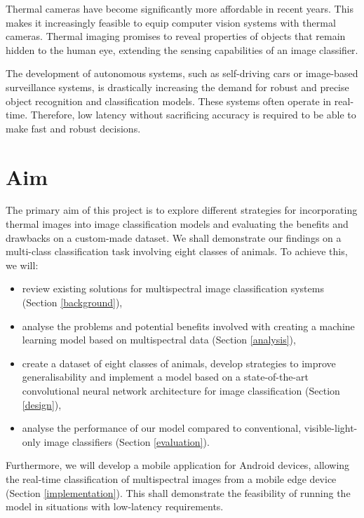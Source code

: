 \documentclass{l4proj}
\begin{document}
Thermal cameras have become significantly more affordable in recent years. This makes it increasingly feasible to equip computer vision systems with thermal cameras. Thermal imaging promises to reveal properties of objects that remain hidden to the human eye, extending the sensing capabilities of an image classifier.

The development of autonomous systems, such as self-driving cars or image-based surveillance systems, is drastically increasing the demand for robust and precise object recognition and classification models. These systems often operate in real-time. Therefore, low latency without sacrificing accuracy is required to be able to make fast and robust decisions.


\section{Aim}

The primary aim of this project is to explore different strategies for incorporating thermal images into image classification models and evaluating the benefits and drawbacks on a custom-made dataset. We shall demonstrate our findings on a multi-class classification task involving eight classes of animals. To achieve this, we will:

\begin{itemize}
  \item review existing solutions for multispectral image classification systems (Section \ref{background}),
  \item analyse the problems and potential benefits involved with creating a machine learning model based on multispectral data (Section \ref{analysis}),
  \item create a dataset of eight classes of animals, develop strategies to improve generalisability and implement a model based on a state-of-the-art convolutional neural network architecture for image classification (Section \ref{design}),
  \item analyse the performance of our model compared to conventional, visible-light-only image classifiers (Section \ref{evaluation}).
\end{itemize}

Furthermore, we will develop a mobile application for Android devices, allowing the real-time classification of multispectral images from a mobile edge device (Section \ref{implementation}). This shall demonstrate the feasibility of running the model in situations with low-latency requirements.
\end{document}
